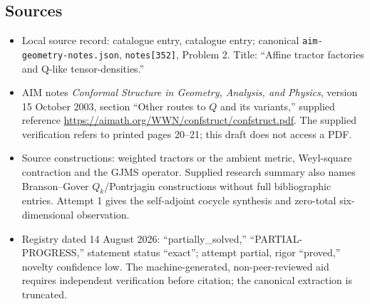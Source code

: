 \documentclass[11pt]{article}
\begin{document}
\subsection{Sources}
\begin{itemize}
\item Local source record: catalogue entry, catalogue entry; canonical \texttt{aim-geometry-notes.json}, \texttt{notes[352]}, Problem 2. Title: ``Affine tractor factories and Q-like tensor-densities.''
\item AIM notes \emph{Conformal Structure in Geometry, Analysis, and Physics}, version 15 October 2003, section ``Other routes to \(Q\) and its variants,'' supplied reference \url{https://aimath.org/WWN/confstruct/confstruct.pdf}. The supplied verification refers to printed pages 20--21; this draft does not access a PDF.
\item Source constructions: weighted tractors or the ambient metric, Weyl-square contraction and the GJMS operator. Supplied research summary also names Branson--Gover \(Q_k\)/Pontrjagin constructions without full bibliographic entries. Attempt 1 gives the self-adjoint cocycle synthesis and zero-total six-dimensional observation.
\item Registry dated 14 August 2026: ``partially\_solved,'' ``PARTIAL-PROGRESS,'' statement status ``exact''; attempt partial, rigor ``proved,'' novelty confidence low. The machine-generated, non-peer-reviewed aid requires independent verification before citation; the canonical extraction is truncated.
\end{itemize}
\end{document}
